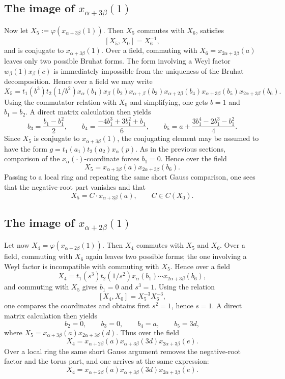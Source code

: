 \documentclass[]{jgcc}
\numberwithin{equation}{section}
\begin{document}
\subsection{\texorpdfstring{The image of $x_{\alpha+3\beta}(1)$}{The image of xalpha+3beta(1)}}

Now let $X_5:=\varphi(x_{\alpha+3\beta}(1))$.
Then $X_5$ commutes with $X_6$, satisfies
\[
[X_5,X_0]=X_6^{-1},
\]
and is conjugate to $x_{\alpha+3\beta}(1)$.
Over a field, commuting with $X_6=x_{2\alpha+3\beta}(a)$ leaves only two possible Bruhat forms.
The form involving a Weyl factor $w_\beta(1)x_\beta(c)$ is immediately impossible from the uniqueness of the Bruhat decomposition.
Hence over a field we may write
\[
X_5=t_1(b^3)t_2(1/b^2)x_\alpha(b_1)x_\beta(b_2)x_{\alpha+\beta}(b_3)x_{\alpha+2\beta}(b_4)x_{\alpha+3\beta}(b_5)x_{2\alpha+3\beta}(b_6).
\]
Using the commutator relation with $X_0$ and simplifying, one gets $b=1$ and $b_1=b_2$.
A direct matrix calculation then yields
\[
b_3=\frac{b_1-b_1^2}{2},\qquad
b_4=\frac{-4b_1^3+3b_1^2+b_1}{6},\qquad
b_5=a+\frac{3b_1^4-2b_1^3-b_1^2}{4}.
\]
Since $X_5$ is conjugate to $x_{\alpha+3\beta}(1)$, the conjugating element may be assumed to have the form
$g=t_1(a_1)t_2(a_2)x_\alpha(p)$.
As in the previous sections, comparison of the $x_\alpha(\cdot)$-coordinate forces $b_1=0$.
Hence over the field
\[
X_5=x_{\alpha+3\beta}(a)x_{2\alpha+3\beta}(b_6).
\]
Passing to a local ring and repeating the same short Gauss comparison, one sees that the negative-root part vanishes and that
\[
X_5=C\cdot x_{\alpha+3\beta}(a),\qquad C\in C(X_0).
\]

\subsection{\texorpdfstring{The image of $x_{\alpha+2\beta}(1)$}{The image of xalpha+2beta(1)}}

Let now $X_4=\varphi(x_{\alpha+2\beta}(1))$.
Then $X_4$ commutes with $X_5$ and $X_6$.
Over a field, commuting with $X_6$ again leaves two possible forms; the one involving a Weyl factor is incompatible with commuting with $X_5$.
Hence over a field
\[
X_4=t_1(s^3)t_2(1/s^2)x_\alpha(b_1)\cdots x_{2\alpha+3\beta}(b_6),
\]
and commuting with $X_5$ gives $b_1=0$ and $s^3=1$.
Using the relation
\[
[X_4,X_0]=X_5^{-3}X_6^{-3},
\]
one compares the coordinates and obtains first $s^2=1$, hence $s=1$.
A direct matrix calculation then yields
\[
b_2=0,\qquad b_3=0,\qquad b_4=a,\qquad b_5=3d,
\]
where $X_5=x_{\alpha+3\beta}(a)x_{2\alpha+3\beta}(d)$.
Thus over the field
\[
X_4=x_{\alpha+2\beta}(a)x_{\alpha+3\beta}(3d)x_{2\alpha+3\beta}(e).
\]
Over a local ring the same short Gauss argument removes the negative-root factor and the torus part, and one arrives at the same expression:
\begin{equation}\label{eq:G2-X4}
X_4=x_{\alpha+2\beta}(a)x_{\alpha+3\beta}(3d)x_{2\alpha+3\beta}(e).
\end{equation}
\end{document}
